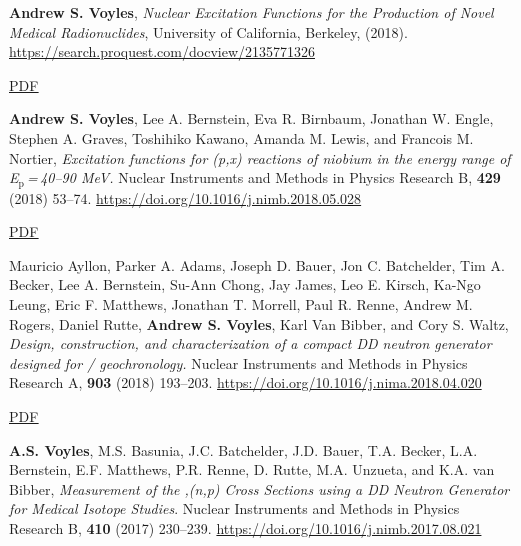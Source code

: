 \begin{bibsection}
\ifshort 
\item \textbf{Andrew S. Voyles}, \emph{Nuclear Excitation Functions for the Production of Novel Medical Radionuclides}, University of California, Berkeley, (2018). \url{https://search.proquest.com/docview/2135771326}
\else  \fi 


\ifshort \vspace{0.1cm} \href{https://avoyles.github.io/papers/ASV_Dissertation.pdf}{\underline{PDF}} \else  \fi 


\item \textbf{Andrew S. Voyles}, Lee A. Bernstein, Eva R. Birnbaum, Jonathan W. Engle, Stephen A. Graves, Toshihiko Kawano, Amanda M. Lewis, and Francois M. Nortier, \emph{Excitation functions for (p,x) reactions of niobium in the energy range of  E$_{\text{p}}$\,=\,40--90 MeV.} Nuclear Instruments and Methods in Physics Research  B, 
\textbf{429} (2018) 53--74. \url{https://doi.org/10.1016/j.nimb.2018.05.028} 


  
\ifshort \vspace{0.1cm} \href{https://avoyles.github.io/papers/Voyles2018_Nb_px.pdf}{\underline{PDF}} \else  \fi 
    
    

\item Mauricio Ayllon, Parker A. Adams, Joseph D. Bauer, Jon C. Batchelder, Tim A. Becker, Lee A. Bernstein, Su-Ann Chong, Jay James, Leo E. Kirsch, Ka-Ngo Leung, Eric F. Matthews, Jonathan T. Morrell, Paul R. Renne, Andrew M. Rogers, Daniel Rutte, \textbf{Andrew S. Voyles}, Karl Van Bibber, and Cory S. Waltz, \emph{Design, construction, and characterization of a compact DD neutron generator designed for / geochronology.} Nuclear Instruments and Methods in Physics Research  A, 
\textbf{903} (2018) 193--203. \url{https://doi.org/10.1016/j.nima.2018.04.020} 

\ifshort \vspace{0.1cm} \href{https://avoyles.github.io/papers/Ayllon2018_geochronology.pdf}{\underline{PDF}} \else  \fi 


\item \textbf{A.S. Voyles}, M.S. Basunia, J.C. Batchelder, J.D. Bauer, T.A. Becker, L.A. Bernstein, E.F. Matthews, P.R. Renne, D. Rutte, M.A. Unzueta, and K.A. van Bibber, \emph{Measurement of the ,(n,p) Cross Sections using a DD Neutron Generator for Medical Isotope Studies}. Nuclear Instruments and Methods in Physics Research  B, \textbf{410} (2017) 230--239. \url{https://doi.org/10.1016/j.nimb.2017.08.021}


\end{bibsection}
